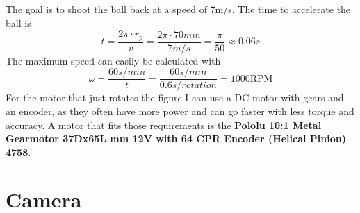 The goal is to shoot the ball back at a speed of 7m/s.
The time to accelerate the ball is
\begin{equation}
    \label{eq:time}
    t = \frac{2\pi\cdot r_p}{v} = \frac{2\pi\cdot 70mm}{7m/s} = \frac{\pi}{50} \approx 0.06s
\end{equation}
The maximum speed can easily be calculated with
\begin{equation}
    \label{eq:max_speed}
    \omega = \frac{60s/min}{t} = \frac{60s/min}{0.6s/rotation} = 1000\text{RPM}
\end{equation}
For the motor that just rotates the figure I can use a DC motor with gears and an encoder, as they often have more power and can go faster with less torque and accuracy.
A motor that fits those requirements is the \textbf{Pololu 10:1 Metal Gearmotor 37Dx65L mm 12V with 64 CPR Encoder (Helical Pinion) 4758}\autocite{pololu-dc}.


\section{Camera}\label{sec:camera}

